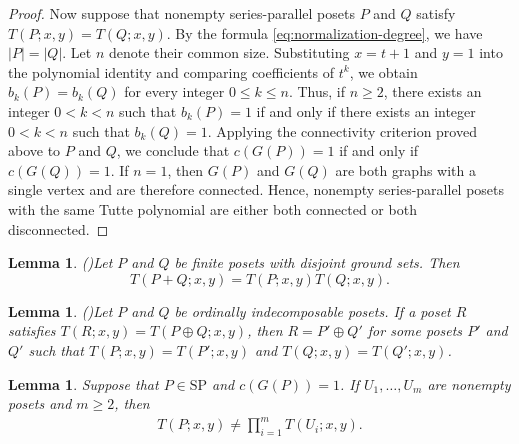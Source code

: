 \documentclass[10pt,a4paper]{amsart}
\newtheorem{lemma}[theorem]{Lemma}
\begin{document}
\begin{proof}
Now suppose that nonempty series-parallel posets $P$ and $Q$
satisfy $T(P;x,y)=T(Q;x,y)$.
By the formula \eqref{eq:normalization-degree}, we have $|P|=|Q|$.
Let $n$ denote their common size.
Substituting $x=t+1$ and $y=1$ into the polynomial identity
and comparing coefficients of $t^k$, we obtain
$b_k(P)=b_k(Q)$ for every integer $0\leq k\leq n$.
Thus, if $n\geq 2$, there exists an integer $0<k<n$
such that $b_k(P)=1$ if and only if there exists an integer
$0<k<n$ such that $b_k(Q)=1$.
Applying the connectivity criterion proved above to $P$ and $Q$,
we conclude that $c(G(P))=1$ if and only if $c(G(Q))=1$.
If $n=1$, then $G(P)$ and $G(Q)$ are both graphs
with a single vertex and are therefore connected.
Hence, nonempty series-parallel posets with the same Tutte polynomial
are either both connected or both disconnected.
\end{proof}

\begin{lemma}(\cite{Gordon1993})\label{lem:sum-formulas}
Let $P$ and $Q$ be finite posets with disjoint ground sets. Then
\begin{equation}\label{eq:direct-sum}
T(P+Q;x,y)=T(P;x,y)T(Q;x,y).
\end{equation}
\end{lemma}

\begin{lemma}(\cite{Gordon1996})\label{lem:ordinal-recovery}
Let $P$ and $Q$ be ordinally indecomposable posets.
If a poset $R$ satisfies $T(R;x,y)=T(P\oplus Q;x,y)$,
then $R=P'\oplus Q'$ for some posets $P'$ and $Q'$
such that $T(P;x,y)=T(P';x,y)$ and $T(Q;x,y)=T(Q';x,y)$.
\end{lemma}

\begin{lemma}\label{lem:no-grouping}
Suppose that $P\in\mathrm{SP}$ and $c(G(P))=1$.
If $U_1,\ldots,U_m$ are nonempty posets and $m\geq 2$, then
\begin{eqnarray*}
T(P;x,y)\neq\prod_{i=1}^{m}T(U_i;x,y).
\end{eqnarray*}
\end{lemma}
\end{document}
